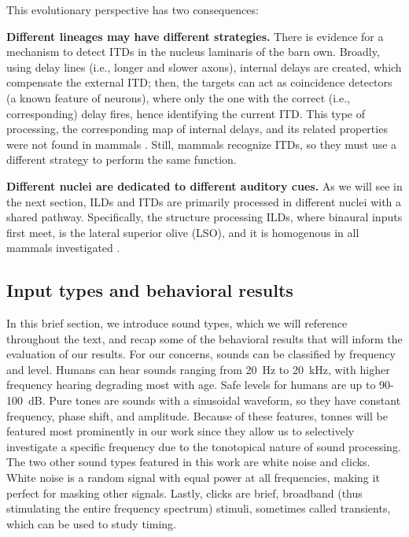 \documentclass[11pt,a4paper]{article}
\newcommand{\parspace}{\vspace{7pt}}
\begin{document}
\parspace

This evolutionary perspective has two consequences: 
\begin{description}
    \item \textbf{Different lineages may have different strategies.} There is evidence \cite{carrCircuitDetectionInteraural1990} for a mechanism to detect ITDs in the nucleus laminaris of the barn own. Broadly, using delay lines (i.e., longer and slower axons), internal delays are created, which compensate the external ITD; then, the targets can act as coincidence detectors (a known feature of neurons), where only the one with the correct (i.e., corresponding) delay fires, hence identifying the current ITD. This type of processing, the corresponding map of internal delays, and its related properties were not found in mammals \cite{yinNeuralMechanismsBinaural2019}. Still, mammals recognize ITDs, so they must use a different strategy to perform the same function.
    \item \textbf{Different nuclei are dedicated to different auditory cues.} As we will see in the next section, ILDs and ITDs are primarily processed in different nuclei with a shared pathway. Specifically, the structure processing ILDs, where binaural inputs first meet, is the lateral superior olive (LSO), and it is homogenous in all mammals investigated \cite{tollinLateralSuperiorOlive2003}.
\end{description}

\subsection{Input types and behavioral results}\label{sec:intro-input}
In this brief section, we introduce sound types, which we will reference throughout the text, and recap some of the behavioral results that will inform the evaluation of our results.
For our concerns, sounds can be classified by frequency and level. Humans can hear sounds ranging from \qty{20}{Hz} to \qty{20}{\kilo\hertz}, with higher frequency hearing degrading most with age. Safe levels for humans are up to 90-\qty{100}{\deci\bel}. Pure tones are sounds with a sinusoidal waveform, so they have constant frequency, phase shift, and amplitude. Because of these features, tonnes will be featured most prominently in our work since they allow us to selectively investigate a specific frequency due to the tonotopical nature of sound processing. The two other sound types featured in this work are white noise and clicks. White noise is a random signal with equal power at all frequencies, making it perfect for masking other signals. Lastly, clicks are brief, broadband (thus stimulating the entire frequency spectrum) stimuli, sometimes called transients, which can be used to study timing.
\end{document}
